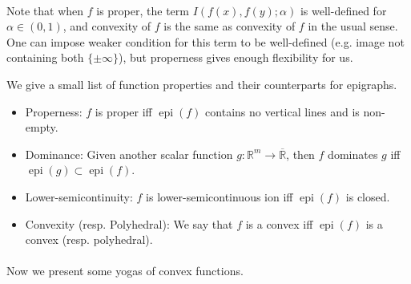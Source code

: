 \paragraph{}Note that when $f$ is proper, the term $I(f(x),f(y);\alpha)$ is well-defined for $\alpha \in(0,1)$, and convexity of $f$ is the same as convexity of $f$ in the usual sense. One can impose weaker condition for this term to be well-defined (e.g. image not containing both $\{\pm\infty\}$), but properness gives enough flexibility for us.

\begin{rmrk}We give a small list of function properties and their counterparts for epigraphs.
	\begin{itemize}
		\item Properness: $f$ is proper iff $\operatorname{epi}(f)$ contains no vertical lines and is non-empty.
		\item Dominance: Given another scalar function $g:\mathbb{R}^m\to \overline{\mathbb{R}}$, then $f$ dominates $g$ iff $\operatorname{epi}(g)\subset \operatorname{epi}(f)$.
		\item Lower-semicontinuity: $f$ is lower-semicontinuous ion iff $\operatorname{epi}(f)$ is closed.
		\item Convexity (resp. Polyhedral): We say that $f$ is a convex iff $\operatorname{epi}(f)$ is a convex (resp. polyhedral).
	\end{itemize}
\end{rmrk}

\paragraph{}Now we present some yogas of convex functions.

